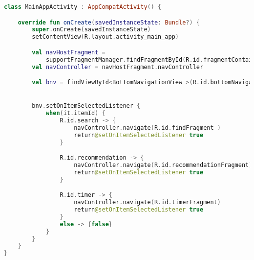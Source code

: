 \begin{lstlisting}[language=Kotlin, caption=\leftline{MainAppActivity}, label=lst:MainAppActivity]
class MainAppActivity : AppCompatActivity() {

    override fun onCreate(savedInstanceState: Bundle?) {
        super.onCreate(savedInstanceState)
        setContentView(R.layout.activity_main_app)

        val navHostFragment =
            supportFragmentManager.findFragmentById(R.id.fragmentContainerView) as NavHostFragment
        val navController = navHostFragment.navController

        val bnv = findViewById<BottomNavigationView >(R.id.bottomNavigationView)


        bnv.setOnItemSelectedListener {
            when(it.itemId) {
                R.id.search -> {
                    navController.navigate(R.id.findFragment )
                    return@setOnItemSelectedListener true
                }

                R.id.recommendation -> {
                    navController.navigate(R.id.recommendationFragment)
                    return@setOnItemSelectedListener true
                }

                R.id.timer -> {
                    navController.navigate(R.id.timerFragment)
                    return@setOnItemSelectedListener true
                }
                else -> {false}
            }
        }
    }
}
\end{lstlisting}

